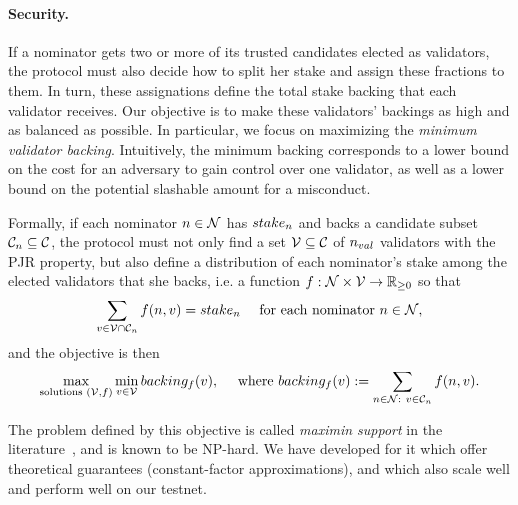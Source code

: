 \paragraph{Security.} If a nominator gets two or more of its trusted candidates elected as validators,
the protocol must also decide how to split her stake and assign these fractions to them.
In turn, these assignations define the total stake backing that each validator receives.
Our objective is to make these validators' backings as high and as balanced as possible.
In particular, we focus on maximizing the \emph{minimum validator backing}.
Intuitively, the minimum backing corresponds to a lower bound on the cost for an adversary to gain control
over one validator, as well as a lower bound on the potential slashable amount for a misconduct.

Formally, if each nominator $n \in \mathcal{N}$ has $stake_{n}$ and backs a candidate subset $\mathcal{C}_{n}\subseteq \mathcal{C}$,
the protocol must not only find a set $\mathcal{V}\subseteq \mathcal{C}$ of $n_{val}$ validators
with the PJR property, but also define a distribution of each nominator's stake among the elected validators that she backs,
i.e. a function $f:\mathcal{N}\times\mathcal{V} \rightarrow \mathbb{R}_{\geq 0}$ so that
$$\sum_{v\in \mathcal{V}\cap \mathcal{C}_{n}} f(n, v) = stake_{n} \quad \text{ for each nominator } n\in\mathcal{N},$$
and the objective is then
$$\max_{\text{solutions } (\mathcal{V}, f)} \min_{v\in \mathcal{V}} backing_f(v),
\quad \text{ where } backing_f(v) := \sum_{n\in \mathcal{N}: \ v\in \mathcal{C}_{n}} f(n, v). $$

The problem defined by this objective is called \emph{maximin support} in the literature~\cite{sanchez2016maximin}, and is known to be NP-hard.
We have developed for it  which offer theoretical guarantees
(constant-factor approximations), and which also scale well and perform well on our testnet.

